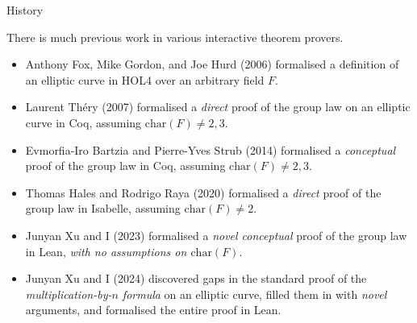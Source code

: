 \documentclass[10pt]{beamer}
\begin{document}
\begin{frame}[t]{History}

There is much previous work in various interactive theorem provers.

\begin{itemize}
\item Anthony Fox, Mike Gordon, and Joe Hurd (2006) formalised a definition of an elliptic curve in HOL4 over an arbitrary field $ F $.

\pause

\item Laurent Th\'ery (2007) formalised a \emph{direct} proof of the group law on an elliptic curve in Coq, assuming $ \mathrm{char}(F) \ne 2, 3 $.

\pause

\item Evmorfia-Iro Bartzia and Pierre-Yves Strub (2014) formalised a \emph{conceptual} proof of the group law in Coq, assuming $ \mathrm{char}(F) \ne 2, 3 $.

\pause

\item Thomas Hales and Rodrigo Raya (2020) formalised a \emph{direct} proof of the group law in Isabelle, assuming $ \mathrm{char}(F) \ne 2 $.

\pause

\item Junyan Xu and I (2023) formalised a \emph{novel conceptual} proof of the group law in Lean, \emph{with no assumptions on $ \mathrm{char}(F) $}.

\pause

\item Junyan Xu and I (2024) discovered gaps in the standard proof of the \emph{multiplication-by-$ n $ formula} on an elliptic curve, filled them in with \emph{novel} arguments, and formalised the entire proof in Lean.
\end{itemize}

\end{frame}
\end{document}
